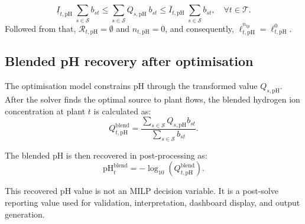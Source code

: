 \begin{equation*}
    \underline{I}_{t,\mathrm{pH}} ~\sum_{s \in \mathcal{S}} b_{st}
    \le \sum_{s \in \mathcal{S}}
    Q_{s,\mathrm{pH}} ~b_{st} \le \overline{I}_{t,\mathrm{pH}} ~\sum_{s \in \mathcal{S}} b_{st}, \quad \forall t \in \mathcal{T}.
\end{equation*}
Followed from that, $\mathcal R_{t, \mathrm{pH}} = \emptyset$ and $n_{t, \mathrm{pH}} = 0$, and consequently, $\ell^{n_{tp}}_{t, \mathrm{pH}} = \ell^0_{t, \mathrm{pH}}$.

\subsection{Blended pH recovery after optimisation}

The optimisation model constrains $\mathrm{pH}$ through the transformed value $Q_{s,\mathrm{pH}}$.
After the solver finds the optimal source to plant flows, the blended hydrogen ion concentration at plant $t$ is calculated as:
\begin{equation}\label{eq:blended_ph_transformed}
    Q^{\mathrm{blend}}_{t,\mathrm{pH}} = \frac{ \sum_{s \in \mathcal{S}} Q_{s,\mathrm{pH}} b_{st} }{ \sum_{s \in \mathcal{S}} b_{st} }.
\end{equation}

The blended $\mathrm{pH}$ is then recovered in post-processing as:
\begin{equation}\label{eq:blended_ph_recovery}
    \mathrm{pH}^{\mathrm{blend}}_{t}
    =
    -\log_{10}
    \left(
    Q^{\mathrm{blend}}_{t,\mathrm{pH}}
    \right).
\end{equation}

This recovered $\mathrm{pH}$ value is not an MILP decision variable.
It is a post-solve reporting value used for validation, interpretation, dashboard display, and output generation.

